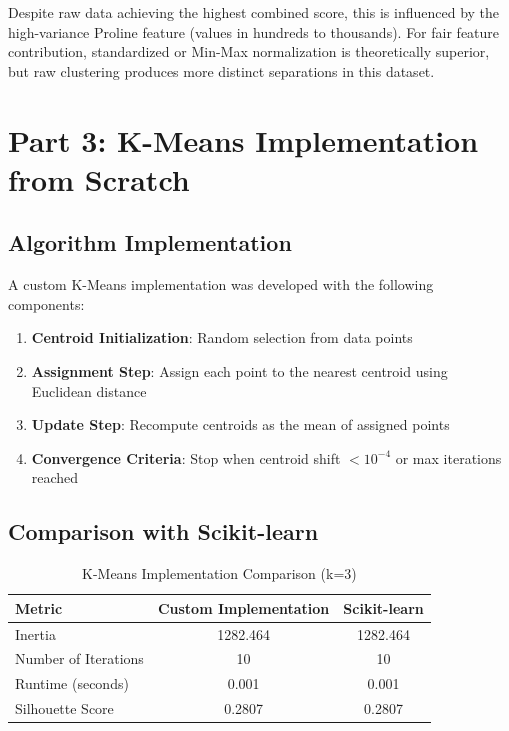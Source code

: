 \documentclass[12pt,a4paper]{article}
\begin{document}
Despite raw data achieving the highest combined score, this is influenced by the high-variance Proline feature (values in hundreds to thousands). For fair feature contribution, standardized or Min-Max normalization is theoretically superior, but raw clustering produces more distinct separations in this dataset.

\section{Part 3: K-Means Implementation from Scratch}

\subsection{Algorithm Implementation}

A custom K-Means implementation was developed with the following components:

\begin{enumerate}
    \item \textbf{Centroid Initialization}: Random selection from data points
    \item \textbf{Assignment Step}: Assign each point to the nearest centroid using Euclidean distance
    \item \textbf{Update Step}: Recompute centroids as the mean of assigned points
    \item \textbf{Convergence Criteria}: Stop when centroid shift $< 10^{-4}$ or max iterations reached
\end{enumerate}

\subsection{Comparison with Scikit-learn}

\begin{table}[H]
\centering
\caption{K-Means Implementation Comparison (k=3)}
\label{tab:kmeans_comparison}
\begin{tabular}{lcc}
\toprule
\textbf{Metric} & \textbf{Custom Implementation} & \textbf{Scikit-learn} \\
\midrule
Inertia & 1282.464 & 1282.464 \\
Number of Iterations & 10 & 10 \\
Runtime (seconds) & 0.001 & 0.001 \\
Silhouette Score & 0.2807 & 0.2807 \\
\bottomrule
\end{tabular}
\end{table}
\end{document}
